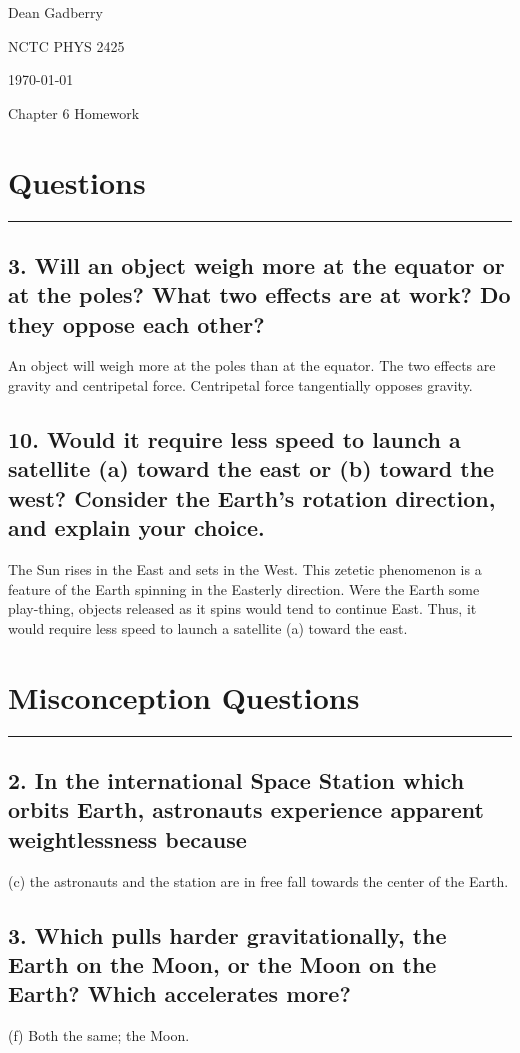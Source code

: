 \documentclass[12pt,a4paper,english]{article}
\begin{document}
\begin{flushright}
  Dean Gadberry

  NCTC PHYS 2425

  \today
\end{flushright}
\begin{center}
  {\large Chapter 6 Homework}
\end{center}
\begin{flushleft}

  \section*{Questions}
  \hrule
  \subsection{3. Will an object weigh more at the equator or at the poles? What two effects are at work? Do they oppose each other?}
  An object will weigh more at the poles than at the equator. The two effects are gravity and centripetal force. Centripetal force tangentially opposes gravity.
  \subsection{10. Would it require less speed to launch a satellite (a) toward the east or (b) toward the west? Consider the Earth's rotation direction, and explain your choice.}
  The Sun rises in the East and sets in the West. This zetetic phenomenon is a feature of the Earth spinning in the Easterly direction. Were the Earth some play-thing, objects released as it spins would tend to continue East. Thus, it would require less speed to launch a satellite (a) toward the east.
  \section*{Misconception Questions}
  \hrule
  \subsection{2. In the international Space Station which orbits Earth, astronauts experience apparent weightlessness because}
  (c) the astronauts and the station are in free fall towards the center of the Earth.
  \subsection{3. Which pulls harder gravitationally, the Earth on the Moon, or the Moon on the Earth? Which accelerates more?}
  (f) Both the same; the Moon.

\end{flushleft}
\end{document}
